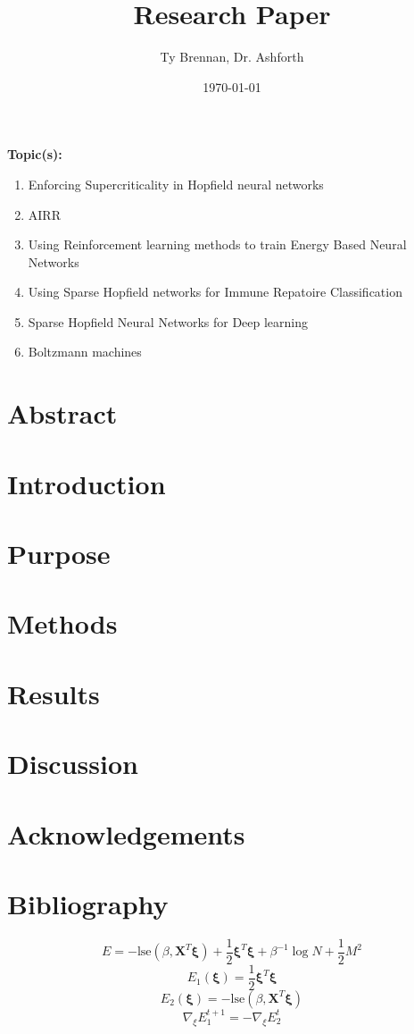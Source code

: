 \documentclass[letterpaper, 12pt]{article}
\title{Research Paper}
\author{Ty Brennan, Dr. Ashforth}
\date{\today}
\begin{document}
\maketitle
\textbf{Topic(s):}
\begin{enumerate}
    \item Enforcing Supercriticality in Hopfield neural networks
    \item AIRR 
    \item Using Reinforcement learning methods to train Energy Based Neural Networks
    \item Using Sparse Hopfield networks for Immune Repatoire Classification
    \item Sparse Hopfield Neural Networks for Deep learning
    \item Boltzmann machines
\end{enumerate}
\section*{Abstract}
\section*{Introduction}
\section*{Purpose}
\section*{Methods}
\section*{Results}
\section*{Discussion}
\section*{Acknowledgements}
\section*{Bibliography}
\[E = -\text{lse}(\beta,\bm{X}^T\bm{\xi})+\frac 1 2 \bm{\xi}^T\bm{\xi} + \beta^{-1}\log{N} + \frac 1 2 M^2\]
\[E_1(\bm{\xi}) = \frac 1 2 \bm{\xi}^T\bm{\xi}\]
\[E_2(\bm{\xi}) = -\text{lse}(\beta, \bm{X}^T\bm{\xi})\]
\[\nabla_\xi E_1^{t+1} = -\nabla_\xi E_2^{t}\]
\end{document}
